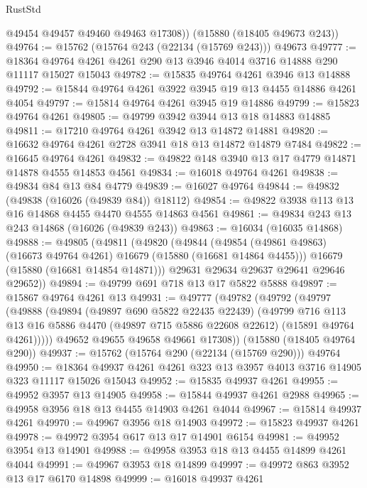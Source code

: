 \begin{lexlean}{RustStd}
\begin{coremodule}
        @49454
        @49457
        @49460
        @49463
        @17308))
    (@15880 (@18405 @49673 @243))
@49764 := @15762 (@15764 @243 (@22134 (@15769 @243))) @49673
@49777 := @18364 @49764 @4261 @4261 @290 @13 @3946 @4014 @3716 @14888 @290 @11117 @15027 @15043
@49782 := @15835 @49764 @4261 @3946 @13 @14888
@49792 := @15844 @49764 @4261 @3922 @3945 @19 @13 @4455 @14886 @4261 @4054
@49797 := @15814 @49764 @4261 @3945 @19 @14886
@49799 := @15823 @49764 @4261
@49805 := @49799 @3942 @3944 @13 @18 @14883 @14885
@49811 := @17210 @49764 @4261 @3942 @13 @14872 @14881
@49820 := @16632 @49764 @4261 @2728 @3941 @18 @13 @14872 @14879 @7484
@49822 := @16645 @49764 @4261
@49832 := @49822 @148 @3940 @13 @17 @4779 @14871 @14878 @4555 @14853 @4561
@49834 := @16018 @49764 @4261
@49838 := @49834 @84 @13 @84 @4779
@49839 := @16027 @49764
@49844 := @49832 (@49838 (@16026 (@49839 @84)) @18112)
@49854 := @49822 @3938 @113 @13 @16 @14868 @4455 @4470 @4555 @14863 @4561
@49861 := @49834 @243 @13 @243 @14868 (@16026 (@49839 @243))
@49863 := @16034 (@16035 @14868)
@49888 := @49805
    (@49811
      (@49820
        (@49844
          (@49854 (@49861 @49863) (@16673 @49764 @4261) @16679 (@15880 (@16681 @14864 @4455)))
          @16679
          (@15880 (@16681 @14854 @14871)))
        @29631
        @29634
        @29637
        @29641
        @29646
        @29652))
@49894 := @49799 @691 @718 @13 @17 @5822 @5888
@49897 := @15867 @49764 @4261 @13
@49931 := @49777
    (@49782
      (@49792
        (@49797
          (@49888
            (@49894
              (@49897 @690 @5822 @22435 @22439)
              (@49799
                @716
                @113
                @13
                @16
                @5886
                @4470
                (@49897 @715 @5886 @22608 @22612)
                (@15891 @49764 @4261)))))
        @49652
        @49655
        @49658
        @49661
        @17308))
    (@15880 (@18405 @49764 @290))
@49937 := @15762 (@15764 @290 (@22134 (@15769 @290))) @49764
@49950 := @18364 @49937 @4261 @4261 @323 @13 @3957 @4013 @3716 @14905 @323 @11117 @15026 @15043
@49952 := @15835 @49937 @4261
@49955 := @49952 @3957 @13 @14905
@49958 := @15844 @49937 @4261 @2988
@49965 := @49958 @3956 @18 @13 @4455 @14903 @4261 @4044
@49967 := @15814 @49937 @4261
@49970 := @49967 @3956 @18 @14903
@49972 := @15823 @49937 @4261
@49978 := @49972 @3954 @617 @13 @17 @14901 @6154
@49981 := @49952 @3954 @13 @14901
@49988 := @49958 @3953 @18 @13 @4455 @14899 @4261 @4044
@49991 := @49967 @3953 @18 @14899
@49997 := @49972 @863 @3952 @13 @17 @6170 @14898
@49999 := @16018 @49937 @4261

\end{coremodule}
\end{lexlean}
